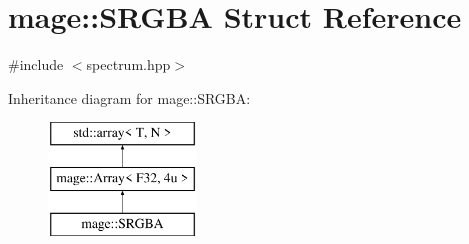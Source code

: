 \hypertarget{structmage_1_1_s_r_g_b_a}{}\section{mage\+:\+:S\+R\+G\+BA Struct Reference}
\label{structmage_1_1_s_r_g_b_a}


{\ttfamily \#include $<$spectrum.\+hpp$>$}

Inheritance diagram for mage\+:\+:S\+R\+G\+BA\+:\begin{figure}[H]
\begin{center}
\leavevmode
\includegraphics[height=3.000000cm]{structmage_1_1_s_r_g_b_a}
\end{center}
\end{figure}
